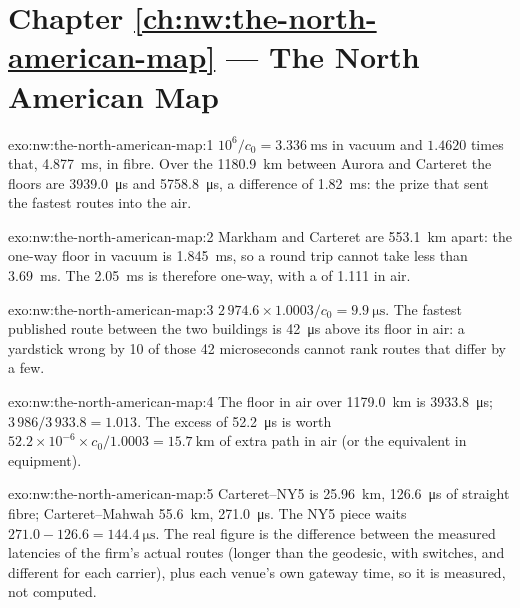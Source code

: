 \section*{Chapter \ref{ch:nw:the-north-american-map} --- The North American Map}

\begin{solution}{exo:nw:the-north-american-map:1}
$10^6/c_0 = \qty{3.336}{\milli\second}$ in vacuum and $1.4620$ times that, \qty{4.877}{\milli\second}, in fibre. Over the
\qty{1180.9}{\kilo\metre} between Aurora and Carteret the floors are \qty{3939.0}{\micro\second} and \qty{5758.8}{\micro\second}, a difference of
\qty{1.82}{\milli\second}: the prize that sent the fastest routes into the air.
\end{solution}

\begin{solution}{exo:nw:the-north-american-map:2}
Markham and Carteret are \qty{553.1}{\kilo\metre} apart: the one-way floor in vacuum is \qty{1.845}{\milli\second}, so a round trip cannot take
less than \qty{3.69}{\milli\second}. The \qty{2.05}{\milli\second} is therefore one-way, with a  of 1.111 in air.
\end{solution}

\begin{solution}{exo:nw:the-north-american-map:3}
$2\,974.6 \times 1.0003 / c_0 = \qty{9.9}{\micro\second}$. The fastest published route between the two buildings is \qty{42}{\micro\second} above its
floor in air: a yardstick wrong by 10 of those 42 microseconds cannot rank routes that differ by a few.
\end{solution}

\begin{solution}{exo:nw:the-north-american-map:4}
The floor in air over \qty{1179.0}{\kilo\metre} is \qty{3933.8}{\micro\second}; $3\,986 / 3\,933.8 = 1.013$. The excess of
\qty{52.2}{\micro\second} is worth $52.2 \times 10^{-6} \times c_0 / 1.0003 = \qty{15.7}{\kilo\metre}$ of extra path in air (or the equivalent in
equipment).
\end{solution}

\begin{solution}{exo:nw:the-north-american-map:5}
Carteret--NY5 is \qty{25.96}{\kilo\metre}, \qty{126.6}{\micro\second} of straight fibre; Carteret--Mahwah \qty{55.6}{\kilo\metre},
\qty{271.0}{\micro\second}. The NY5 piece waits $271.0 - 126.6 = \qty{144.4}{\micro\second}$. The real figure is the difference between the
measured latencies of the firm's actual routes (longer than the geodesic, with switches, and different for each carrier), plus each venue's
own gateway time, so it is measured, not computed.
\end{solution}

